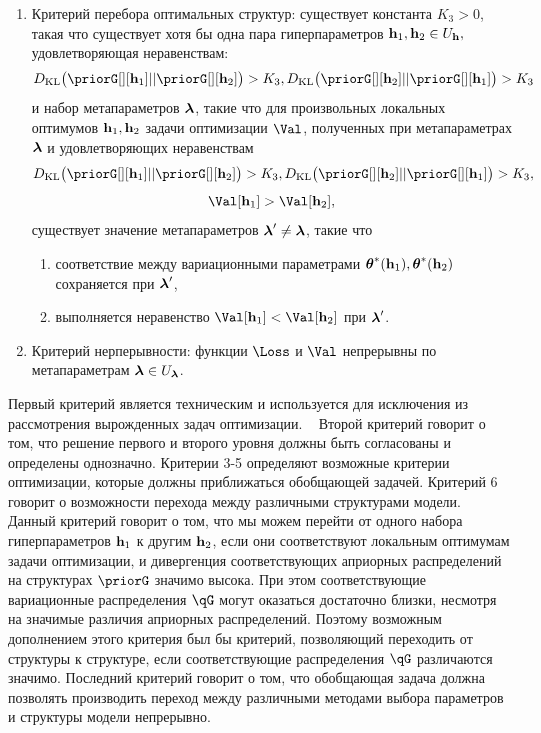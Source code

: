 \begin{defin}
\begin{enumerate}
\item Критерий перебора оптимальных структур: существует константа $K_3>0$, такая что существует хотя бы одна пара гиперпараметров $\mathbf{h}_1, \mathbf{h}_2 \in U_{\mathbf{h}},$ удовлетворяющая неравенствам:
$$\KL{\priorG[][\h_1]}{\priorG[][\h_2]} > K_3,\KL{\priorG[][\h_2]}{\priorG[][\h_1]}>K_3$$ и набор метапараметров $\boldsymbol{\lambda}$, такие что для произвольных локальных оптимумов  $\mathbf{h}_1,\mathbf{h}_2$ задачи оптимизации $\Val$, полученных при метапараметрах $\boldsymbol{\lambda}$ и удовлетворяющих неравенствам $$\KL{\priorG[][\h_1]}{\priorG[][\h_2]} > K_3, \KL{\priorG[][\h_2]}{\priorG[][\h_1]}>K_3,$$$$\Val[\h_1] > \Val[\h_2],$$  существует значение метапараметров $\boldsymbol{\lambda}' \neq \boldsymbol{\lambda}$, такие что
\begin{enumerate}
\item соответствие между вариационными параметрами $\boldsymbol{\theta}^{*}(\mathbf{h}_1),\boldsymbol{\theta}^{*}(\mathbf{h}_2)$ сохраняется при  $\boldsymbol{\lambda}'$,
\item выполняется неравенство $\Val[\h_1] < \Val[\h_2]$ при $\boldsymbol{\lambda}'$.
\end{enumerate}


\item Критерий нерперывности: функции $\Loss$ и $\Val$ непрерывны по метапараметрам $\boldsymbol{\lambda} \in U_{\boldsymbol{\lambda}}$.
\end{enumerate}
\end{defin}
Первый критерий является техническим и используется для исключения из рассмотрения вырожденных задач оптимизации.  
Второй критерий говорит о том, что решение первого и второго уровня должны быть согласованы и определены однозначно.
Критерии 3-5 определяют возможные критерии оптимизации, которые должны приближаться обобщающей задачей.
Критерий 6 говорит о возможности перехода между различными структурами модели. Данный критерий говорит о том, что мы можем перейти от одного набора гиперпараметров $\mathbf{h}_1$ к другим $\mathbf{h}_2$, если они соответствуют локальным оптимумам задачи оптимизации, и дивергенция соответствующих априорных  распределений на структурах $\priorG$ значимо высока. При этом соответствующие вариационные распределения $\qG$ могут оказаться достаточно близки, несмотря на значимые различия априорных распределений. Поэтому возможным дополнением этого критерия был бы критерий, позволяющий переходить от структуры к структуре, если соответствующие распределения $\qG$ различаются значимо.
Последний критерий говорит о том, что обобщающая задача должна позволять производить переход между различными методами выбора  параметров и структуры модели непрерывно.

